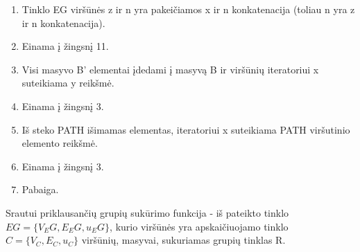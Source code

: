\begin{enumerate}
	\item  Tinklo EG viršūnės z ir n yra pakeičiamos x ir n konkatenacija (toliau n yra z ir n konkatenacija).
	\item  Einama į žingsnį 11.
	\item  Visi masyvo B' elementai įdedami į masyvą B ir viršūnių iteratoriui x suteikiama y reikšmė.
	\item  Einama į žingsnį 3.
	\item  Iš steko PATH išimamas elementas, iteratoriui x suteikiama PATH viršutinio elemento reikšmė.
	\item  Einama į žingsnį 3.
	\item  Pabaiga.
\end{enumerate}

Srautui priklausančių grupių sukūrimo funkcija - iš pateikto tinklo $EG=\{V_EG, E_EG, u_EG\}$, kurio viršūnės yra apskaičiuojamo tinklo $C=\{V_C, E_C, u_C\}$ viršūnių, masyvai, sukuriamas grupių tinklas R.

